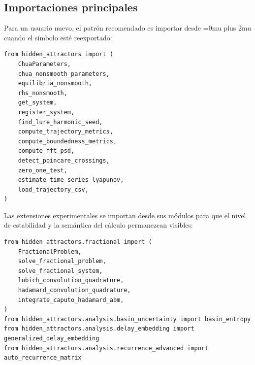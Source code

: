 \documentclass[11pt]{article}
\DeclareRobustCommand{\codepath}[1]{\begingroup\Urlmuskip=0mu plus 2mu\path{#1}\endgroup}
\begin{document}
\subsection{Importaciones principales}

Para un usuario nuevo, el patrón recomendado es importar desde
\codepath{hidden_attractors} cuando el símbolo esté reexportado:

\begin{verbatim}
from hidden_attractors import (
    ChuaParameters,
    chua_nonsmooth_parameters,
    equilibria_nonsmooth,
    rhs_nonsmooth,
    get_system,
    register_system,
    find_lure_harmonic_seed,
    compute_trajectory_metrics,
    compute_boundedness_metrics,
    compute_fft_psd,
    detect_poincare_crossings,
    zero_one_test,
    estimate_time_series_lyapunov,
    load_trajectory_csv,
)
\end{verbatim}

Las extensiones experimentales se importan desde sus módulos para que el nivel
de estabilidad y la semántica del cálculo permanezcan visibles:

\begin{verbatim}
from hidden_attractors.fractional import (
    FractionalProblem,
    solve_fractional_problem,
    solve_fractional_system,
    lubich_convolution_quadrature,
    hadamard_convolution_quadrature,
    integrate_caputo_hadamard_abm,
)
from hidden_attractors.analysis.basin_uncertainty import basin_entropy
from hidden_attractors.analysis.delay_embedding import generalized_delay_embedding
from hidden_attractors.analysis.recurrence_advanced import auto_recurrence_matrix
\end{verbatim}
\end{document}
